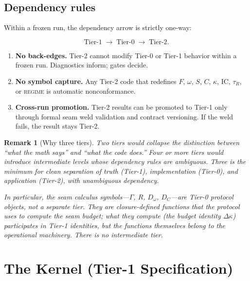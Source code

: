 \documentclass[
  aps,
  prd,
  twocolumn,
  superscriptaddress,
  nofootinbib,
  floatfix
]{revtex4-2}
\newtheorem{remark}{Remark}
\newcommand{\tR}{\tau_{\!R}}
\newcommand{\Gam}{\Gamma}
\newcommand{\beq}{\begin{equation}}
\newcommand{\eeq}{\end{equation}}
\newcommand{\regime}[1]{\textrm{\upshape\scshape#1}}
\newcommand{\IC}{\mathrm{IC}}
\begin{document}
\subsection{Dependency rules}

Within a frozen run, the dependency arrow is strictly one-way:

\beq
  \text{Tier-1} \;\longrightarrow\; \text{Tier-0}
  \;\longrightarrow\; \text{Tier-2}.
\eeq

\begin{enumerate}[leftmargin=*,label=(\alph*)]
\item \textbf{No back-edges.}  Tier-2 cannot modify Tier-0 or
  Tier-1 behavior within a frozen run.  Diagnostics inform;
  gates decide.

\item \textbf{No symbol capture.}  Any Tier-2 code that redefines
  $F$, $\omega$, $S$, $C$, $\kappa$, $\IC$, $\tR$, or
  \regime{regime} is automatic nonconformance.

\item \textbf{Cross-run promotion.}  Tier-2 results can be promoted
  to Tier-1 only through formal seam weld validation and contract
  versioning.  If the weld fails, the result stays Tier-2.
\end{enumerate}

\begin{remark}[Why three tiers]
Two tiers would collapse the distinction between ``what the math
says'' and ``what the code does.''  Four or more tiers would
introduce intermediate levels whose dependency rules are ambiguous.
Three is the minimum for clean separation of \emph{truth}
(Tier-1), \emph{implementation} (Tier-0), and \emph{application}
(Tier-2), with unambiguous dependency.

In particular, the seam calculus symbols---$\Gam$, $R$, $D_\omega$,
$D_C$---are \emph{Tier-0 protocol objects}, not a separate
tier.  They are closure-defined functions that the protocol uses
to compute the seam budget; \emph{what they compute} (the budget
identity $\Delta\kappa$) participates in Tier-1 identities, but
the functions themselves belong to the operational machinery.
There is no intermediate tier.
\end{remark}


\section{The Kernel (Tier-1 Specification)}\label{sec:kernel}
\end{document}
